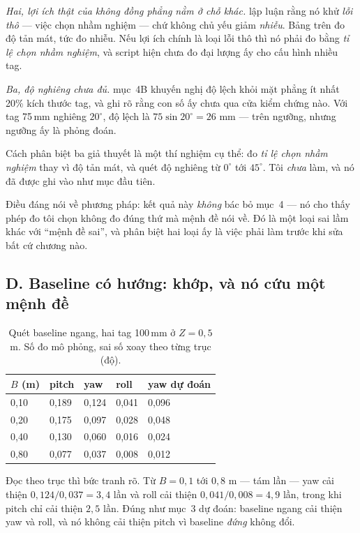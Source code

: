 \documentclass[../../marker.tex]{subfiles}
\begin{document}
\emph{Hai, lợi ích thật của không đồng phẳng nằm ở chỗ khác.}  lập luận rằng nó khử \emph{lỗi thô} --- việc chọn nhầm nghiệm --- chứ không chủ yếu giảm \emph{nhiễu}. Bảng trên đo độ tản mát, tức đo nhiễu. Nếu lợi ích chính là loại lỗi thô thì nó phải đo bằng \emph{tỉ lệ chọn nhầm nghiệm}, và script hiện chưa đo đại lượng ấy cho cấu hình nhiều tag.

\emph{Ba, độ nghiêng chưa đủ.}  mục~4B khuyến nghị độ lệch khỏi mặt phẳng ít nhất 20\% kích thước tag, và ghi rõ rằng con số ấy chưa qua cửa kiểm chứng nào. Với tag 75\,mm nghiêng \(20^\circ\), độ lệch là \(75\sin 20^\circ = 26\) mm --- trên ngưỡng, nhưng ngưỡng ấy là phỏng đoán.

Cách phân biệt ba giả thuyết là một thí nghiệm cụ thể: đo \emph{tỉ lệ chọn nhầm nghiệm} thay vì độ tản mát, và quét độ nghiêng từ \(0^\circ\) tới \(45^\circ\). Tôi \emph{chưa} làm, và nó đã được ghi vào  như mục đầu tiên.

Điều đáng nói về phương pháp: kết quả này \emph{không} bác bỏ  mục~4 --- nó cho thấy phép đo tôi chọn không đo đúng thứ mà mệnh đề nói về. Đó là một loại sai lầm khác với ``mệnh đề sai'', và phân biệt hai loại ấy là việc phải làm trước khi sửa bất cứ chương nào.

\subsection{D. Baseline có hướng: khớp, và nó cứu một mệnh đề}

\begin{table}[H]\centering\small
\caption{Quét baseline ngang, hai tag 100\,mm ở \(Z = 0{,}5\) m. Số đo mô phỏng, sai số xoay theo từng trục (độ).}
\label{tab:c16-baseline}
\begin{tabularx}{\linewidth}{@{}L{1.6cm}L{1.8cm}L{1.8cm}L{1.8cm}Y@{}}
\toprule
\(B\) (m) & pitch & yaw & roll & yaw dự đoán\\
,10 & 0,189 & 0,124 & 0,041 & 0,096\\
0,20 & 0,175 & 0,097 & 0,028 & 0,048\\
0,40 & 0,130 & 0,060 & 0,016 & 0,024\\
0,80 & 0,077 & 0,037 & 0,008 & 0,012\\
\bottomrule
\end{tabularx}
\end{table}

Đọc theo trục thì bức tranh rõ. Từ \(B = 0{,}1\) tới \(0{,}8\) m --- tám lần --- yaw cải thiện \(0{,}124/0{,}037 = 3{,}4\) lần và roll cải thiện \(0{,}041/0{,}008 = 4{,}9\) lần, trong khi pitch chỉ cải thiện \(2{,}5\) lần. Đúng như  mục~3 dự đoán: baseline ngang cải thiện yaw và roll, và nó không cải thiện pitch vì baseline \emph{đứng} không đổi.
\end{document}
